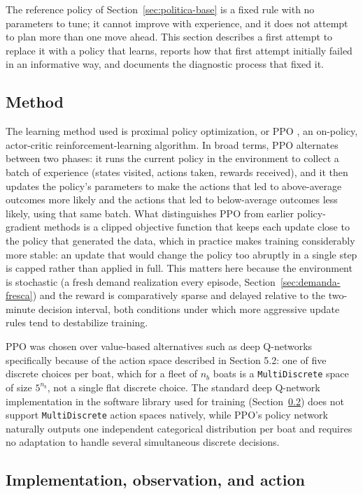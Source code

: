 \documentclass[11pt,a4paper]{article}
\begin{document}
The reference policy of Section~\ref{sec:politica-base} is a fixed rule with no parameters to tune; it cannot improve with experience, and it does not attempt to plan more than one move ahead. This section describes a first attempt to replace it with a policy that learns, reports how that first attempt initially failed in an informative way, and documents the diagnostic process that fixed it.

\subsection{Method}

The learning method used is proximal policy optimization, or PPO \citep{Schulman2017}, an on-policy, actor-critic reinforcement-learning algorithm. In broad terms, PPO alternates between two phases: it runs the current policy in the environment to collect a batch of experience (states visited, actions taken, rewards received), and it then updates the policy's parameters to make the actions that led to above-average outcomes more likely and the actions that led to below-average outcomes less likely, using that same batch. What distinguishes PPO from earlier policy-gradient methods is a clipped objective function that keeps each update close to the policy that generated the data, which in practice makes training considerably more stable: an update that would change the policy too abruptly in a single step is capped rather than applied in full. This matters here because the environment is stochastic (a fresh demand realization every episode, Section~\ref{sec:demanda-fresca}) and the reward is comparatively sparse and delayed relative to the two-minute decision interval, both conditions under which more aggressive update rules tend to destabilize training.

PPO was chosen over value-based alternatives such as deep Q-networks specifically because of the action space described in Section 5.2: one of five discrete choices per boat, which for a fleet of $n_b$ boats is a \texttt{MultiDiscrete} space of size $5^{n_b}$, not a single flat discrete choice. The standard deep Q-network implementation in the software library used for training (Section~\ref{sec:implementacion}) does not support \texttt{MultiDiscrete} action spaces natively, while PPO's policy network naturally outputs one independent categorical distribution per boat and requires no adaptation to handle several simultaneous discrete decisions.

\subsection{Implementation, observation, and action}
\label{sec:implementacion}
\end{document}
